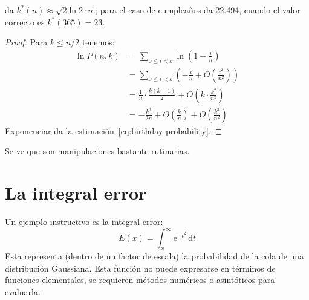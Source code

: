   da \(k^*(n) \approx \sqrt{2 \ln 2 \cdot n}\);
  para el caso de cumpleaños da \num{22,494},
  cuando el valor correcto es \(k^*(365) = 23\).
  \begin{proof}
    Para \(k \le n / 2\) tenemos:
    \begin{align*}
      \ln P(n, k)
        &= \sum_{0 \le i < k} \ln \left( 1 - \frac{i}{n} \right) \\
        &= \sum_{0 \le i < k}
             \left(
               - \frac{i}{n} + O\left( \frac{i^2}{n^2} \right)
             \right) \\
        &= \frac{1}{n} \cdot \frac{k (k - 1)}{2}
             + O\left( k \cdot \frac{k^2}{n^2} \right) \\
        &= - \frac{k^2}{2 n}
             + O\left( \frac{k}{n} \right)
             + O\left( \frac{k^3}{n^2} \right)
    \end{align*}
    Exponenciar da la estimación~\eqref{eq:birthday-probability}.
  \end{proof}
  Se ve que son manipulaciones bastante rutinarias.

\section{La integral error}
\label{sec:error-integral}


  Un ejemplo instructivo es la integral error:
  \begin{equation*}
    E(x)
      = \int_x^\infty \mathrm{e}^{-t^2} \, \mathrm{d} t
  \end{equation*}
  Esta representa
  (dentro de un factor de escala)
  la probabilidad de la cola de una distribución Gaussiana.
  Esta función no puede expresarse en términos de funciones elementales,
  se requieren métodos numéricos o asintóticos para evaluarla.

